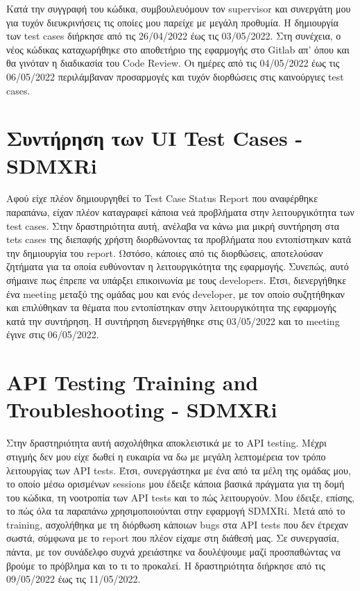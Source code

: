 Κατά την συγγραφή του κώδικα, συμβουλευόμουν τον supervisor και συνεργάτη μου για τυχόν διευκρινήσεις τις οποίες μου παρείχε με μεγάλη προθυμία. 
Η δημιουργία των test cases διήρκησε από τις 26/04/2022 έως τις 03/05/2022. Στη συνέχεια, ο νέος κώδικας καταχωρήθηκε στο αποθετήριο της εφαρμογής 
στο Gitlab απ' όπου και θα γινόταν η διαδικασία του Code Review. Οι ημέρες από τις 04/05/2022 έως τις 06/05/2022 περιλάμβαναν προσαρμογές και τυχόν 
διορθώσεις στις καινούργιες test cases.

\section*{Συντήρηση των UI Test Cases - SDMXRi}
Αφού είχε πλέον δημιουργηθεί το Test Case Status Report που αναφέρθηκε παραπάνω, είχαν πλέον καταγραφεί κάποια νεά προβλήματα στην λειτουργικότητα 
των test cases. Στην δραστηριότητα αυτή, ανέλαβα να κάνω μια μικρή συντήρηση στα tets cases της διεπαφής χρήστη διορθώνοντας τα προβλήματα 
που εντοπίστηκαν κατά την δημιουργία του report. Ωστόσο, κάποιες από τις διορθώσεις, αποτελούσαν ζητήματα για τα οποία ευθύνονταν η λειτουργικότητα της 
εφαρμογής. Συνεπώς, αυτό σήμαινε πως έπρεπε να υπάρξει επικοινωνία με τους developers. Έτσι, διενεργήθηκε ένα meeting μεταξύ της ομάδας μου 
και ενός developer, με τον οποίο συζητήθηκαν και επιλύθηκαν τα θέματα που εντοπίστηκαν στην λειτουργικότητα της εφαρμογής κατά την συντήρηση.
Η συντήρηση διενεργήθηκε στις 03/05/2022 και το meeting έγινε στις 06/05/2022.

\section*{API Testing Training and Troubleshooting - SDMXRi}
Στην δραστηριότητα αυτή ασχολήθηκα αποκλειστικά με το API testing. Μέχρι στιγμής δεν μου είχε δωθεί η ευκαιρία να δω με μεγάλη λεπτομέρεια 
τον τρόπο λειτουργίας των API tests. Έτσι, συνεργάστηκα με ένα από τα μέλη της ομάδας μου, το οποίο μέσω ορισμένων sessions μου έδειξε κάποια βασικά 
πράγματα για τη δομή του κώδικα, τη νοοτροπία των API tests και το πώς λειτουργούν. Μου έδειξε, επίσης, το πώς όλα τα παραπάνω χρησιμοποιούνται 
στην εφαρμογή SDMXRi. Μετά από το training, ασχολήθηκα με τη διόρθωση κάποιων bugs στα API tests που δεν έτρεχαν σωστά, σύμφωνα με το report 
που πλέον είχαμε στη διάθεσή μας. Σε συνεργασία, πάντα, με τον συνάδελφο συχνά χρειάστηκε να δουλέψουμε μαζί προσπαθώντας να βρούμε το πρόβλημα 
και το τι το προκαλεί. Η δραστηριότητα διήρκησε από τις 09/05/2022 έως τις 11/05/2022.

